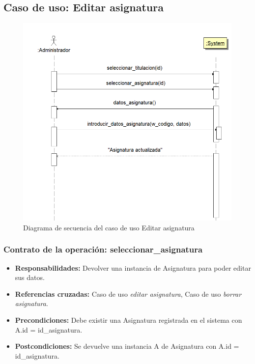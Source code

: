 \documentclass{book}
\begin{document}
\subsection{Caso de uso: Editar asignatura}
\begin{figure}[H] 
  \label{comportamiento-edit-asignatura} 
	\begin{center}
    \includegraphics[scale=0.5]{./secuencia-edit-asignatura.png}
  \end{center}
\caption{Diagrama de secuencia del caso de uso Editar asignatura}
\end{figure}

\subsubsection{Contrato de la operación: seleccionar\_asignatura}
\begin{itemize}
\item {\bf Responsabilidades:} Devolver una instancia de Asignatura para poder editar sus datos.
\item {\bf Referencias cruzadas:} Caso de uso {\em editar asignatura}, Caso de uso {\em borrar asignatura}.
\item {\bf Precondiciones:} Debe existir una Asignatura registrada en el sistema con A.id = id\_asignatura.
\item {\bf Postcondiciones:} Se devuelve una instancia A de Asignatura con A.id = id\_asignatura.
\end{itemize}
\end{document}
